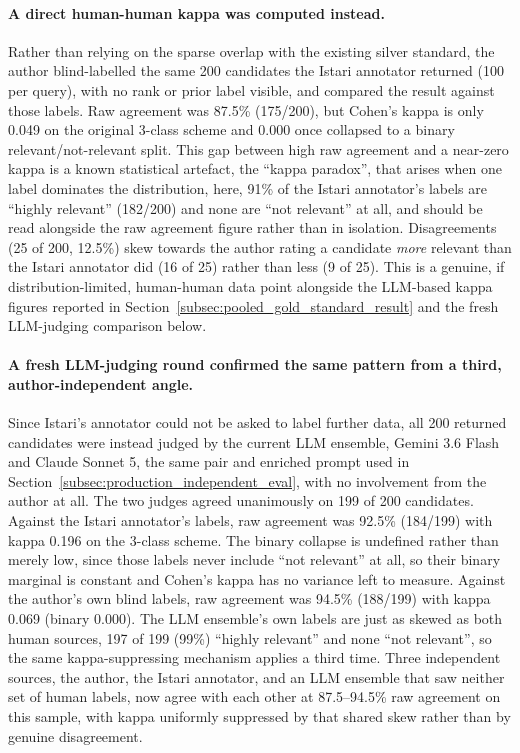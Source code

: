 \documentclass[a4paper,oneside,bibliography=totoc]{scrbook}
\begin{document}
\paragraph{A direct human-human kappa was computed instead.} Rather than relying on the sparse overlap with the existing silver standard, the author blind-labelled the same 200 candidates the Istari annotator returned (100 per query), with no rank or prior label visible, and compared the result against those labels. Raw agreement was 87.5\% (175/200), but Cohen's kappa is only 0.049 on the original 3-class scheme and 0.000 once collapsed to a binary relevant/not-relevant split. This gap between high raw agreement and a near-zero kappa is a known statistical artefact, the ``kappa paradox'', that arises when one label dominates the distribution, here, 91\% of the Istari annotator's labels are ``highly relevant'' (182/200) and none are ``not relevant'' at all, and should be read alongside the raw agreement figure rather than in isolation. Disagreements (25 of 200, 12.5\%) skew towards the author rating a candidate \emph{more} relevant than the Istari annotator did (16 of 25) rather than less (9 of 25). This is a genuine, if distribution-limited, human-human data point alongside the LLM-based kappa figures reported in Section~\ref{subsec:pooled_gold_standard_result} and the fresh LLM-judging comparison below.

\paragraph{A fresh LLM-judging round confirmed the same pattern from a third, author-independent angle.} Since Istari's annotator could not be asked to label further data, all 200 returned candidates were instead judged by the current LLM ensemble, Gemini 3.6 Flash and Claude Sonnet 5, the same pair and enriched prompt used in Section~\ref{subsec:production_independent_eval}, with no involvement from the author at all. The two judges agreed unanimously on 199 of 200 candidates. Against the Istari annotator's labels, raw agreement was 92.5\% (184/199) with kappa 0.196 on the 3-class scheme. The binary collapse is undefined rather than merely low, since those labels never include ``not relevant'' at all, so their binary marginal is constant and Cohen's kappa has no variance left to measure. Against the author's own blind labels, raw agreement was 94.5\% (188/199) with kappa 0.069 (binary 0.000). The LLM ensemble's own labels are just as skewed as both human sources, 197 of 199 (99\%) ``highly relevant'' and none ``not relevant'', so the same kappa-suppressing mechanism applies a third time. Three independent sources, the author, the Istari annotator, and an LLM ensemble that saw neither set of human labels, now agree with each other at 87.5--94.5\% raw agreement on this sample, with kappa uniformly suppressed by that shared skew rather than by genuine disagreement.
\end{document}
